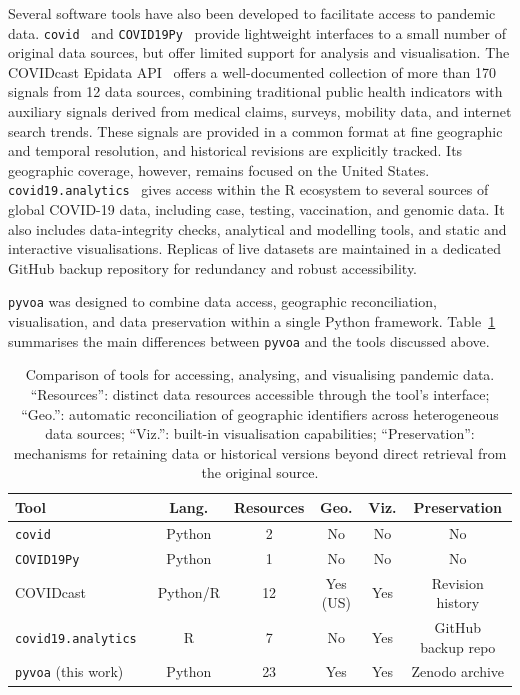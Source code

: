 \documentclass[preprint,12pt,a4paper]{elsarticle}
\begin{document}
\bigskip

Several software tools have also been developed to facilitate access to pandemic data. \texttt{covid}~\cite{covid_pypi} and
\texttt{COVID19Py}~\cite{covid19py} provide lightweight interfaces to a small
number of original data sources, but offer limited support for analysis and
visualisation. The COVIDcast Epidata API~\cite{reinhart2021} offers a
well-documented collection of more than 170 signals from 12 data sources,
combining traditional public health indicators with auxiliary signals derived
from medical claims, surveys, mobility data, and internet search trends. These
signals are provided in a common format at fine geographic and temporal
resolution, and historical revisions are explicitly tracked. Its geographic
coverage, however, remains focused on the United States.
\texttt{covid19.analytics}~\cite{ponce2021} gives access within the R
ecosystem to several sources of global COVID-19 data, including case, testing,
vaccination, and genomic data. It also includes data-integrity checks,
analytical and modelling tools, and static and interactive visualisations.
Replicas of live datasets are maintained in a dedicated GitHub backup
repository for redundancy and robust accessibility.


\texttt{pyvoa} was designed to combine data access, geographic reconciliation,
visualisation, and data preservation within a single Python framework.
Table~\ref{tab:comparison} summarises the main differences between
\texttt{pyvoa} and the tools discussed above.

\begin{table}[!ht]
\centering
\footnotesize
\setlength{\tabcolsep}{3pt}
\begin{tabular}{lccccc}
\toprule
\textbf{Tool} & \textbf{Lang.} & \textbf{Resources} &
\textbf{Geo.} & \textbf{Viz.} & \textbf{Preservation} \\
\midrule
\texttt{covid}~\cite{covid_pypi}
    & Python & 2 & No & No & No \\
\texttt{COVID19Py}~\cite{covid19py}
    & Python & 1 & No & No & No \\
COVIDcast~\cite{reinhart2021}
    & Python/R & 12 & Yes (US) & Yes & Revision history \\
\texttt{covid19.analytics}~\cite{ponce2021}
    & R & 7 & No & Yes & GitHub backup repo \\
\texttt{pyvoa} (this work)
    & Python & 23 & Yes & Yes & Zenodo archive \\
\bottomrule
\end{tabular}

\caption{Comparison of tools for accessing, analysing, and visualising pandemic
data. ``Resources'': distinct data resources accessible through the tool's interface;
``Geo.'': automatic reconciliation of geographic identifiers across
heterogeneous data sources; ``Viz.'': built-in visualisation capabilities;
``Preservation'': mechanisms for retaining data or historical versions beyond
direct retrieval from the original source.}

\label{tab:comparison}
\end{table}
\end{document}
